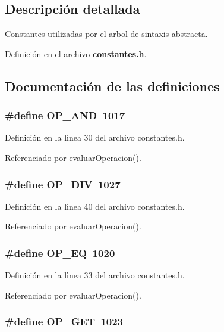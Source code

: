 \subsection{Descripci\'{o}n detallada}
Constantes utilizadas por el arbol de sintaxis abstracta. 



Definici\'{o}n en el archivo {\bf constantes.h}.

\subsection{Documentaci\'{o}n de las definiciones}
\subsubsection{\setlength{\rightskip}{0pt plus 5cm}\#define OP\_\-AND~1017}\label{constantes_8h_a19}




Definici\'{o}n en la l\'{\i}nea 30 del archivo constantes.h.

Referenciado por evaluar\-Operacion().
\subsubsection{\setlength{\rightskip}{0pt plus 5cm}\#define OP\_\-DIV~1027}\label{constantes_8h_a29}




Definici\'{o}n en la l\'{\i}nea 40 del archivo constantes.h.

Referenciado por evaluar\-Operacion().
\subsubsection{\setlength{\rightskip}{0pt plus 5cm}\#define OP\_\-EQ~1020}\label{constantes_8h_a22}




Definici\'{o}n en la l\'{\i}nea 33 del archivo constantes.h.

Referenciado por evaluar\-Operacion().
\subsubsection{\setlength{\rightskip}{0pt plus 5cm}\#define OP\_\-GET~1023}\label{constantes_8h_a25}




